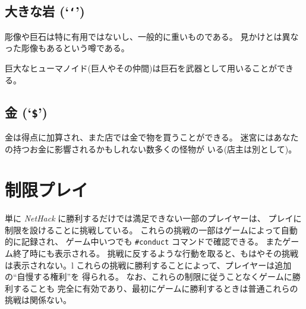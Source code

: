 \subsection*{大きな岩 (`{\tt `}')}

彫像や巨石は特に有用ではないし、一般的に重いものである。
見かけとは異なった彫像もあるという噂である。

巨大なヒューマノイド(巨人やその仲間)は巨石を武器として用いることができる。

\subsection*{金 (`{\tt \$}')}

金は得点に加算され、また店では金で物を買うことができる。
%
迷宮にはあなたの持つお金に影響されるかもしれない数多くの怪物が
いる(店主は別として)。


\section{制限プレイ}

単に {\it NetHack\/} に勝利するだけでは満足できない一部のプレイヤーは、
プレイに制限を設けることに挑戦している。
これらの挑戦の一部はゲームによって自動的に記録され、
ゲーム中いつでも {\tt \#conduct} コマンドで確認できる。
またゲーム終了時にも表示される。
挑戦に反するような行動を取ると、もはやその挑戦は表示されない。l
これらの挑戦に勝利することによって、プレイヤーは追加の``自慢する権利''を
得られる。
なお、これらの制限に従うことなくゲームに勝利することも
完全に有効であり、最初にゲームに勝利するときは普通これらの挑戦は関係ない。

